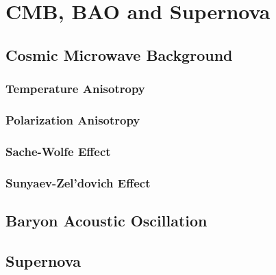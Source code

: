 \chapter{CMB, BAO and Supernova}

\section{Cosmic Microwave Background}
\subsection{Temperature Anisotropy}

\subsection{Polarization Anisotropy}

\subsection{Sache-Wolfe Effect}

\subsection{Sunyaev-Zel'dovich Effect}

\section{Baryon Acoustic Oscillation}


\section{Supernova}